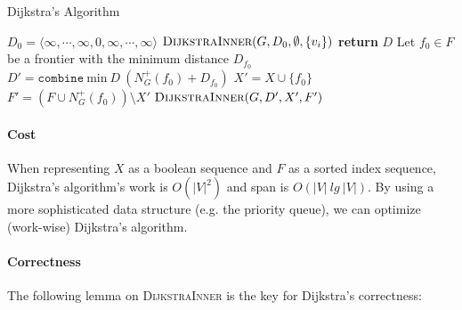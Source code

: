 \documentclass[11pt,a4paper,oneside,microtype,nokorean]{oblivoir}
\begin{document}
\begin{algorithm}
  \caption{Dijkstra's Algorithm}\label{dijkstra}
  \begin{algorithmic}[1]
     
    \State $D_0 = \langle \infty, \cdots, \infty, 0, \infty, \cdots, \infty \rangle$ 
    \State $\Call{DijkstraInner}{G,D_0,\emptyset,\{v_i\}}$
    \EndProcedure
    \Statex
     
    \State \textbf{return} $D$
    \EndIf
    \State Let $f_0 \in F$ be a frontier with the minimum distance $D_{f_0}$
    \State $D' = \texttt{combine}~\textrm{min}~D~(N^+_G(f_0) + D_{f_0})$ 
    \State $X' = X \cup \{f_0\}$
    \State $F' = (F \cup N^+_G(f_0)) \setminus X'$
    \State $\Call{DijkstraInner}{G,D',X',F'}$
    \EndProcedure
  \end{algorithmic}
\end{algorithm}


\paragraph{Cost}

When representing $X$ as a boolean sequence and $F$ as a sorted index sequence, Dijkstra's
algorithm's work is $O(|V|^2)$ and span is $O(|V|~lg~|V|)$.  By using a more sophisticated data
structure (e.g. the priority queue), we can optimize (work-wise) Dijkstra's algorithm.



\paragraph{Correctness} The following lemma on \textsc{DijkstraInner} is the key for Dijkstra's
correctness:
\end{document}
